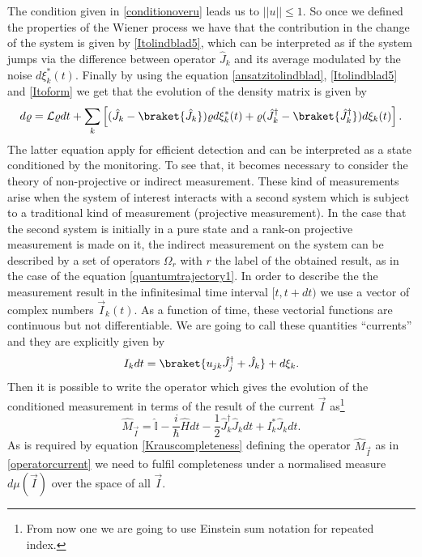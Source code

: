 The condition given in \eqref{conditionoveru} leads us to $||u||\leq 1$. So once we defined the properties of the Wiener process we have that the contribution in the change of the system is given by \eqref{Itolindblad5}, which can be interpreted as if the system jumps via the difference between operator $\hat{J}_{k}$ and its average modulated by the noise $d\xi_{k}^{*}(t)$. Finally by using the equation \eqref{ansatzitolindblad}, \eqref{Itolindblad5} and \eqref{Itoform} we get that the evolution of the density matrix is given by
\begin{equation}
d\varrho=\mathcal{L}\varrho dt+\sum_{k}\left[(\hat{J}_{k}-\braket{\hat{J}_k})\varrho d\xi^{*}_{k}(t)+\varrho(\hat{J}_k^{\dagger}-\braket{\hat{J}_k^{\dagger}})d\xi_k(t)\right].
\label{Itolindbladeq}
\end{equation}
The latter equation apply for efficient detection and can be interpreted as a state conditioned by the monitoring. To see that, it becomes necessary to consider the theory of non-projective or indirect measurement. These kind of measurements arise when the system of interest interacts with a second system which is subject to a traditional kind of measurement (projective measurement)\cite{WISEMAN200191}. In the case that the second system is initially in a pure state and a rank-on projective measurement is made on it, the indirect measurement on the system can be described by a set of operators $\Omega_{r}$ with $r$ the label of the obtained result, as in the case of the equation \eqref{quantumtrajectory1}. In order to describe the the measurement result in the infinitesimal time interval $[t,t+dt)$ we use a vector of complex numbers $\vec{I}_{k}(t)$. As a function of time, these vectorial functions are continuous but not differentiable. We are going to call these quantities ``currents'' and they are explicitly given by
\begin{equation}
I_{k}dt=\braket{u_{jk}\hat{J}_j^{\dagger}+\hat{J}_k}+d\xi_k.
\label{current}
\end{equation} 
Then it is possible to write the operator which gives the evolution of the conditioned measurement in terms of the result of the current $\vec{I}$ as\footnote{From now one we are going to use Einstein sum notation for repeated index.}
\begin{equation}
\hat{M}_{\vec{I}}=\hat{\mathbb{I}}-\frac{i}{\hbar}\hat{H}dt-\frac{1}{2}\hat{J}_k^{\dagger}\hat{J}_k dt+I^{*}_{k}\hat{J}_{k}dt.
\label{operatorcurrent}
\end{equation}
As is required by equation \eqref{Krauscompleteness} defining the operator $\hat{M}_{\vec{I}}$ as in \eqref{operatorcurrent} we need to fulfil completeness under a normalised measure $d\mu(\vec{I})$ over the space of all $\vec{I}$.
